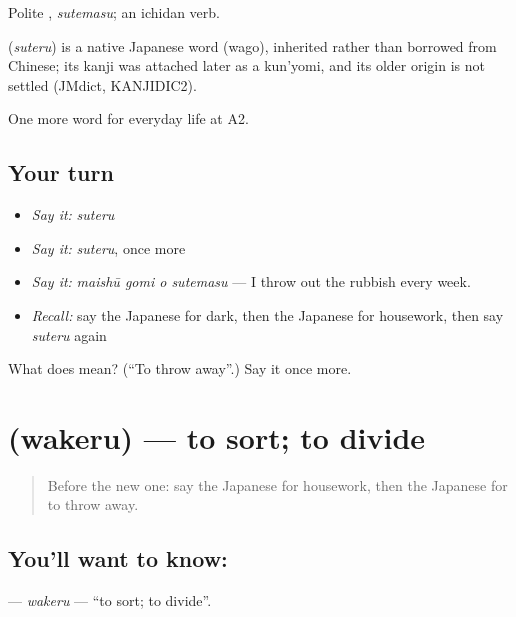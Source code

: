 Polite \textbf{}, \emph{sutemasu}; an ichidan verb.

\begin{cousinweb}
\textbf{} (\emph{suteru}) is a native Japanese word (wago), inherited rather than borrowed from Chinese; its kanji was attached later as a kun'yomi, and its older origin is not settled (JMdict, KANJIDIC2).
\end{cousinweb}

\begin{grammarlens}[title={What you've built}]
One more word for everyday life at A2.
\end{grammarlens}

\subsection*{Your turn}
\begin{itemize}
\raggedright
  \item \emph{Say it:} \emph{suteru}
  \item \emph{Say it:} \emph{suteru}, once more
  \item \emph{Say it:} \emph{maishū gomi o sutemasu} — I throw out the rubbish every week.
  \item \emph{Recall:} say the Japanese for dark, then the Japanese for housework, then say \emph{suteru} again
\end{itemize}

\begin{tcolorbox}[breakable,colback=teal!4,colframe=teal!35!black,title={Before you move on}]
What does  mean? (\textquotedblleft{}To throw away\textquotedblright{}.) Say it once more.
\end{tcolorbox}
\section[\texorpdfstring{\ja{わける} (wakeru)}{わける (wakeru)}]{ (wakeru) — to sort; to divide}

\label{lesson:JA-C159-wakeru}



\begin{quote}
Before the new one: say the Japanese for housework, then the Japanese for to throw away.
\end{quote}

\subsection*{You'll want to know: }
\textbf{} — \emph{wakeru} — \textquotedblleft{}to sort; to divide\textquotedblright{}.

